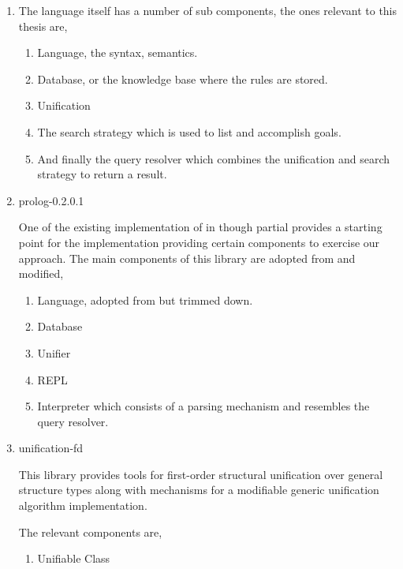 \documentclass[thesis-solanki.tex]{subfiles}
\begin{document}
\begin{enumerate}
\item {} 

The language itself has a number of sub components, the ones relevant to this thesis are,
\begin{enumerate}
\item Language, the syntax, semantics.

\item Database, or the knowledge base where the rules are stored.

\item Unification

\item The search strategy which is used to list and accomplish goals.

\item And finally the query resolver which combines the unification and search strategy to return a result.
\end{enumerate} 

\item prolog-0.2.0.1 \cite{prolog-lib}

One of the existing implementation of  in  though partial provides a starting point for the 
implementation providing certain components to exercise our approach. The main components of this library are adopted from 
 and modified,

\begin{enumerate}
\item Language, adopted from  but trimmed down.

\item Database

\item Unifier

\item REPL

\item Interpreter which consists of a parsing mechanism and resembles the query resolver.  
\end{enumerate} 

\item unification-fd \cite{unification-fd-lib}

This library provides tools for first-order structural unification over general structure types along with mechanisms for a modifiable 
generic unification algorithm implementation. 

The relevant components are,
\begin{enumerate}
\item Unifiable Class


\end{enumerate}
\end{enumerate}
\end{document}

